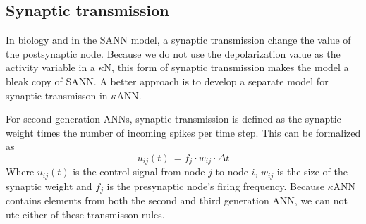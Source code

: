

	
	\subsection{Synaptic transmission}
	\label{ssecSynTransForANNliggeriKANNsection}

		In biology and in the SANN model, a synaptic transmission change the value of the postsynaptic node.
		Because we do not use the depolarization value as the activity variable in a $\kappa$N, this form of synaptic transmission makes the model a bleak copy of SANN.   %
		A better approach is to develop a separate model for synaptic transmisson in $\kappa$ANN.

		For second generation ANNs, synaptic transmission is defined as the synaptic weight times the number of incoming spikes per time step.
		This can be formalized as
		\begin{equation}
			u_{ij}(t) \, = f_{j} \cdot w_{ij} \cdot \Delta t
			\label{eqSynapticTransmissionFor2genANN}
		\end{equation}
		Where $u_{ij}(t)$ is the control signal from node $j$ to node $i$, $w_{ij}$ is the size of the synaptic weight %
			and $f_j$ is the presynaptic node's firing frequency.
		Because $\kappa$ANN contains elements from both the second and third generation ANN, %
																							 we can not ute either of these transmisson rules.

